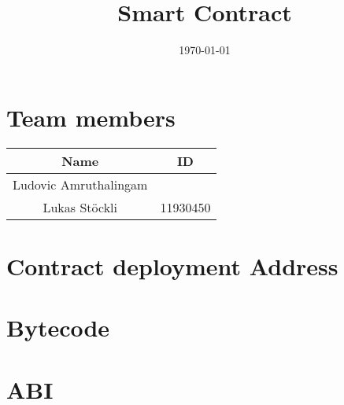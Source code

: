 \documentclass[a4]{article}
\begin{document}
\date{\today}
\title{Smart Contract}
\maketitle


\section*{Team members}
\begin{center}
	\begin{tabular}{|c|c|}
		\hline
		 Name & ID \\
		\hline
		 Ludovic Amruthalingam &  \\
		 Lukas Stöckli & 11930450 \\
		\hline
	\end{tabular}
\end{center}

\section*{Contract deployment Address}

\section*{Bytecode}

\section*{ABI}
\end{document}
